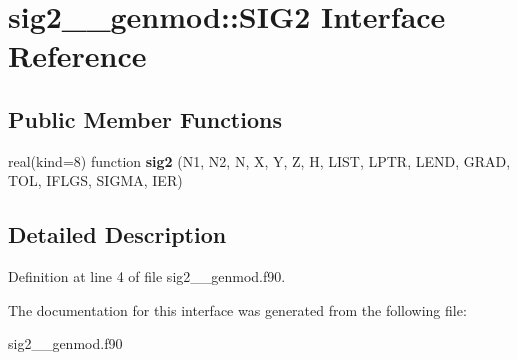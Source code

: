 \hypertarget{interfacesig2____genmod_1_1_s_i_g2}{\section{sig2\+\_\+\+\_\+genmod\+:\+:S\+I\+G2 Interface Reference}
\label{interfacesig2____genmod_1_1_s_i_g2}
}
\subsection*{Public Member Functions}
\begin{DoxyCompactItemize}
\item 
\hypertarget{interfacesig2____genmod_1_1_s_i_g2_a8ae044698fa049548b7b638d9c7ccb33}{real(kind=8) function {\bfseries sig2} (N1, N2, N, X, Y, Z, H, L\+I\+S\+T, L\+P\+T\+R, L\+E\+N\+D, G\+R\+A\+D, T\+O\+L, I\+F\+L\+G\+S, S\+I\+G\+M\+A, I\+E\+R)}\label{interfacesig2____genmod_1_1_s_i_g2_a8ae044698fa049548b7b638d9c7ccb33}

\end{DoxyCompactItemize}


\subsection{Detailed Description}


Definition at line 4 of file sig2\+\_\+\+\_\+genmod.\+f90.



The documentation for this interface was generated from the following file\+:\begin{DoxyCompactItemize}
\item 
sig2\+\_\+\+\_\+genmod.\+f90\end{DoxyCompactItemize}

